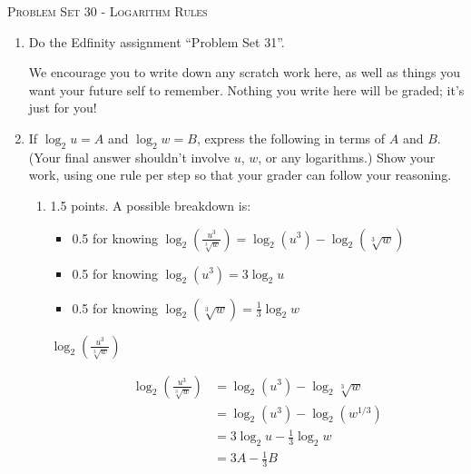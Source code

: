 \documentclass{article}
\newcommand{\doedfinity}[2][\newpage]{
  \begin{problem}[#1]
    Do the Edfinity assignment ``Problem Set #2''.

    We encourage you to write down any scratch work here, as well as
    things you want your future self to remember. Nothing you write
    here will be graded; it's just for you!
  \end{problem}
}
\begin{document}
\begin{center}
  \large\textsc{Problem Set 30 - Logarithm Rules}
\end{center}

\begin{enumerate}
\item  {}

  \doedfinity{31}

\item %

  If $\log_2 u = A$ and $\log_2 w = B$, express the following in terms of $A$ and $B$. (Your final answer shouldn't involve $u$, $w$, or any logarithms.) Show your work, using one rule per step so that your grader can follow your reasoning.

  \begin{enumerate}

  \item

    \begin{grading}
      1.5 points. A possible breakdown is:
      \begin{itemize}[nosep]
      \item 0.5 for knowing $\displaystyle \log_2\left(\frac{u^3}{\sqrt[3]{w}}\right) = \log_2 (u^3) - \log_2(\sqrt[3]{w})$
      \item 0.5 for knowing $\log_2(u^3) = 3 \log_2 u$
      \item 0.5 for knowing $\log_2(\sqrt[3]{w}) = \frac{1}{3} \log_2 w$
      \end{itemize}
    \end{grading}

    \begin{problem}[\vfill]
      $\displaystyle \log_2\left(\frac{u^3}{\sqrt[3]{w}}\right)$
    \end{problem}

    \begin{solution}
      \begin{align*}
        \log_2\left(\frac{u^3}{\sqrt[3]{w}}\right) &= 
        \log_2 (u^3) - \log_2 \sqrt[3]{w} \\
        &= \log_2 (u^3) - \log_2 (w^{1/3}) \\
        &= 3\log_2 u - \tfrac{1}{3} \log_2 w\\
        &= \boxed{3A - \tfrac{1}{3} B}
      \end{align*}
    \end{solution}


\end{enumerate}
\end{enumerate}
\end{document}
